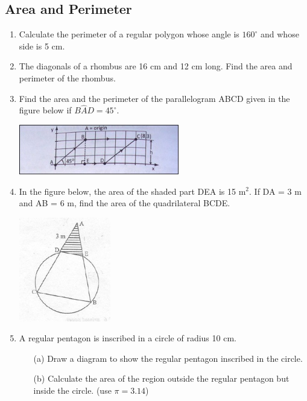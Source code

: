 	\subsection{Area and Perimeter} \label{f4ap}
\begin{enumerate}

	\item Calculate the perimeter of a regular polygon whose angle is $160^\circ$ and whose side is 5 cm.
	
	\item The diagonals of a rhombus are 16 cm and 12 cm long. Find the area and perimeter of the rhombus.
	
	\item Find the area and the perimeter of the parallelogram ABCD given in the figure below if $B\hat{A}D = 45^\circ$.
	\begin{center}
	\includegraphics[width=7cm]{./img/ap1.jpg}
	\end{center}

	\item In the figure below, the area of the shaded part DEA is 15 m$^2$. If DA = 3 m and AB = 6 m, find the area of the quadrilateral BCDE.
	\begin{center}
	\includegraphics[width=4cm]{./img/ap2.jpg}
	\end{center}

	\item A regular pentagon is inscribed in a circle of radius 10 cm.
		\begin{itemize}
		\item[(a)] Draw a diagram to show the regular pentagon inscribed in the circle.
		\item[(b)] Calculate the area of the region outside the regular pentagon but inside the circle. (use $\pi = 3.14$)
		\end{itemize}
		

\end{enumerate}
